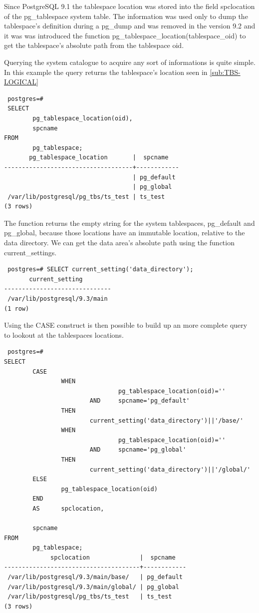 Since PostgreSQL 9.1 the tablespace location was stored into the field spclocation of the 
pg\_tablespace system table. The information was used only to dump the 
tablespace's definition during a pg\_dump and was removed in the version 9.2 and it was was 
introduced the function pg\_tablespace\_location(tablespace\_oid) to get the tablespace's absolute 
path from the tablespace oid.\newline

Querying the system catalogue to acquire any sort of informations is quite  simple. In this example 
the query returns the tablespace's location seen in \ref{sub:TBS-LOGICAL} 

\begin{verbatim}
 postgres=# 
 SELECT 
        pg_tablespace_location(oid),
        spcname 
FROM 
        pg_tablespace;
       pg_tablespace_location       |  spcname   
------------------------------------+------------
                                    | pg_default
                                    | pg_global
 /var/lib/postgresql/pg_tbs/ts_test | ts_test
(3 rows)

\end{verbatim}

The function returns the empty string for the system tablespaces, pg\_default and pg\_global, 
because those locations have an immutable location, relative to the data directory. We can get the 
data area's absolute path using the function current\_settings. 

\begin{verbatim}
 postgres=# SELECT current_setting('data_directory');
       current_setting        
------------------------------
 /var/lib/postgresql/9.3/main
(1 row)

\end{verbatim}

Using the CASE construct is then possible to build up an more complete query to lookout at the 
tablespaces locations.\newpage

\begin{verbatim}
 postgres=# 
SELECT 
        CASE
                WHEN 
                                pg_tablespace_location(oid)=''
                        AND     spcname='pg_default'
                THEN
                        current_setting('data_directory')||'/base/'
                WHEN 
                                pg_tablespace_location(oid)=''
                        AND     spcname='pg_global'
                THEN
                        current_setting('data_directory')||'/global/'
        ELSE
                pg_tablespace_location(oid)
        END
        AS      spclocation,
                
        spcname 
FROM 
        pg_tablespace;
             spclocation              |  spcname   
--------------------------------------+------------
 /var/lib/postgresql/9.3/main/base/   | pg_default
 /var/lib/postgresql/9.3/main/global/ | pg_global
 /var/lib/postgresql/pg_tbs/ts_test   | ts_test
(3 rows)

\end{verbatim}

